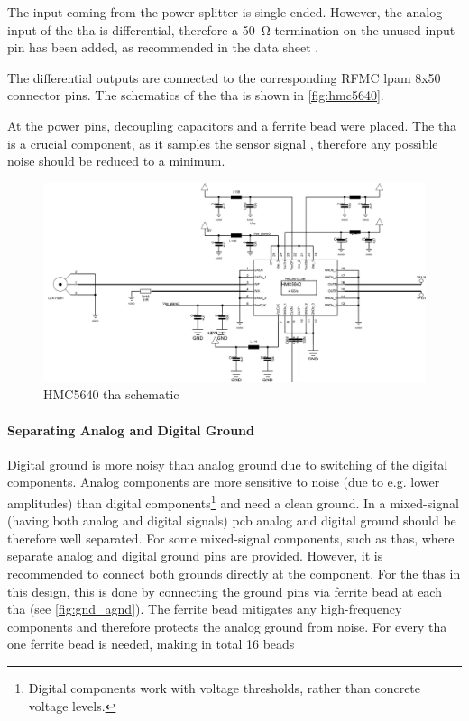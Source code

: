 The input coming from the power splitter is single-ended.
However, the analog input of the \gls{tha} is differential, therefore a \SI{50}{\ohm} termination on the unused input pin has been added, as recommended in the data sheet \cite{hmc5640}.

The differential outputs are connected to the corresponding RFMC \gls{lpam} 8x50 connector pins.
The schematics of the \gls{tha} is shown in \autoref{fig:hmc5640}.

At the power pins, decoupling capacitors and a ferrite bead  were placed. The \gls{tha} is a crucial component, as it samples the sensor signal , therefore any possible noise should be reduced to a minimum.


\begin{figure}[tbh]
	\centering
	\includegraphics[width = \textwidth]{chap/04-work/img/hmc5640}
	\caption[HMC5640 THA schematic]{HMC5640 \gls{tha} schematic}
	\label{fig:hmc5640}
\end{figure}
\paragraph{Separating Analog and Digital Ground}
Digital ground is more noisy than analog ground due to switching of the digital components. 
Analog components are more sensitive to noise (due to e.g. lower amplitudes) than digital components\footnote{Digital components work with voltage thresholds, rather than concrete voltage levels.} and need a clean ground.
In a mixed-signal (having both analog and digital signals) \gls{pcb} analog and digital ground should be therefore well separated.
For some mixed-signal components, such as \glspl{tha}, where separate analog and digital ground pins are provided.
However, it is recommended to connect both grounds directly at the component.
For the \glspl{tha} in this design, this is done by connecting the ground pins via ferrite bead at each \gls{tha} (see \autoref{fig:gnd_agnd}). 
The ferrite bead mitigates any high-frequency components and therefore protects the analog ground from noise.
For every \gls{tha} one ferrite bead is needed, making in total 16 beads

